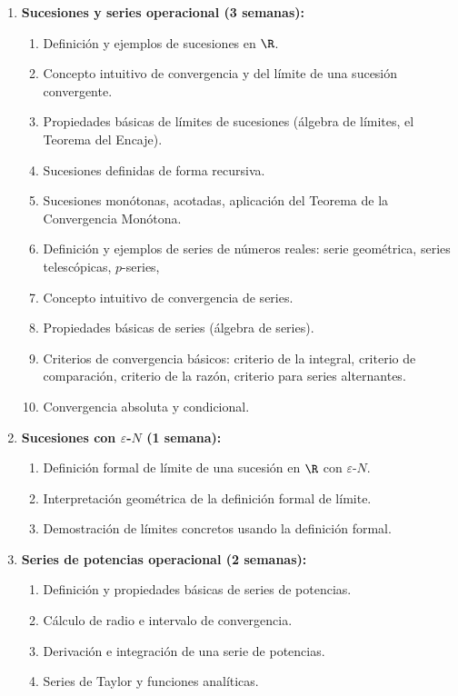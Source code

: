 \begin{refsection}
\begin{enumerate}
\item \textbf{Sucesiones y series operacional (3 semanas):} 
\begin{enumerate}
    \item Definición y ejemplos de sucesiones en $\R$.
    \item Concepto intuitivo de convergencia y del límite de una sucesión convergente.
    \item Propiedades básicas de límites de sucesiones (álgebra de límites, el Teorema del Encaje).
    \item Sucesiones definidas de forma recursiva.
    \item Sucesiones monótonas, acotadas, aplicación del Teorema de la Convergencia Monótona.
    \item Definición y ejemplos de series de números reales: serie geométrica, series telescópicas, $p$-series, 
    \item Concepto intuitivo de convergencia de series.
    \item Propiedades básicas de series (álgebra de series).
    \item Criterios de convergencia básicos: criterio de la integral, criterio de comparación, criterio de la razón, criterio para series alternantes.
    \item Convergencia absoluta y condicional.
\end{enumerate}


\item \textbf{Sucesiones con $\varepsilon$-$N$ (1 semana):} 
\begin{enumerate}
    \item Definición formal de límite de una sucesión en $\R$ con $\varepsilon$-$N$.
    \item Interpretación geométrica de la definición formal de límite.
    \item Demostración de límites concretos usando la definición formal.
\end{enumerate}

\item \textbf{Series de potencias operacional (2 semanas):} 
\begin{enumerate}
    \item Definición y propiedades básicas de series de potencias.
    \item Cálculo de radio e intervalo de convergencia.
    \item Derivación e integración de una serie de potencias.
    \item Series de Taylor y funciones analíticas.
\end{enumerate}


\end{enumerate}
\end{refsection}
